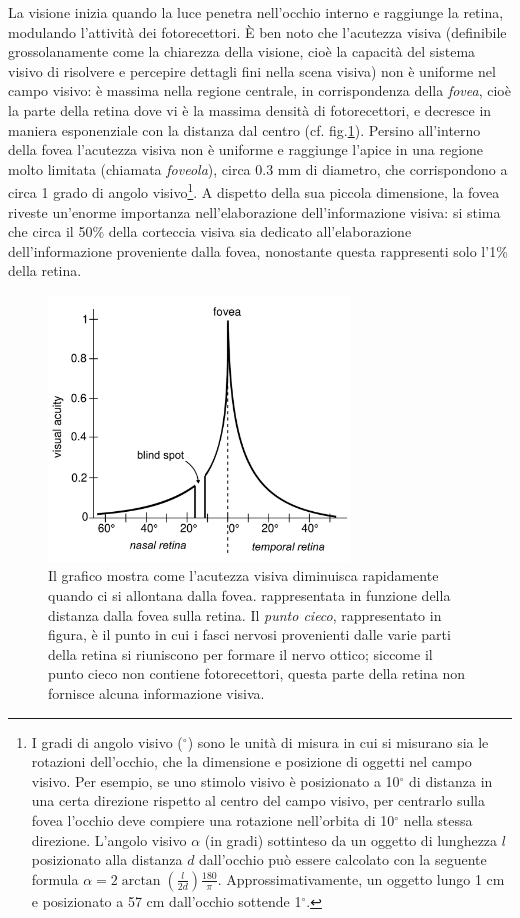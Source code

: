 \documentclass[12pt]{article}
\begin{document}
La visione inizia quando la luce penetra nell'occhio interno e raggiunge la retina, modulando l'attivit\`a dei fotorecettori. \`E ben noto che l'acutezza visiva (definibile grossolanamente come la chiarezza della visione, cio\`e la capacità del sistema visivo di risolvere e percepire dettagli fini nella scena visiva) non \`e uniforme nel campo visivo: \`e massima nella regione centrale, in corrispondenza della \textit{fovea}, cioè la parte della retina dove vi \`e la massima densità di fotorecettori, e decresce in maniera esponenziale con la distanza dal centro (cf. fig.\ref{fig1}). Persino all'interno della fovea l'acutezza visiva non \`e uniforme e raggiunge l'apice in una regione molto limitata (chiamata \textit{foveola}), circa 0.3 mm di diametro, che corrispondono a circa 1 grado di angolo visivo\footnote{I gradi di angolo visivo ($^{\circ}$) sono le unit\`a di misura in cui si misurano sia le rotazioni dell'occhio, che la dimensione e posizione di oggetti nel campo visivo. Per esempio, se uno stimolo visivo è posizionato a 10$^{\circ}$ di distanza in una certa direzione rispetto al centro del campo visivo, per centrarlo sulla fovea l'occhio deve compiere una rotazione nell'orbita di 10$^{\circ}$ nella stessa direzione. L'angolo visivo $\alpha$ (in gradi) sottinteso da un oggetto di lunghezza $l$ posizionato alla distanza $d$ dall'occhio può essere calcolato con la seguente formula $\alpha = 2 \arctan(\frac{l}{2d}) \frac{180}{\pi}$. Approssimativamente, un oggetto lungo 1 cm e posizionato a 57 cm dall'occhio sottende 1$^{\circ}$.}. A dispetto della sua piccola dimensione, la fovea riveste un'enorme importanza nell'elaborazione dell'informazione visiva: si stima che circa il 50\% della corteccia visiva sia dedicato all'elaborazione dell'informazione proveniente dalla fovea, nonostante questa rappresenti solo l'1\% della retina. 

\begin{figure}
\centering
\includegraphics[width=80mm]{fig1.pdf}
\caption{Il grafico mostra come l'acutezza visiva diminuisca rapidamente quando ci si allontana dalla fovea. rappresentata in funzione della distanza dalla fovea sulla retina. Il \textit{punto cieco}, rappresentato in figura, è il punto in cui i fasci nervosi provenienti dalle varie parti della retina si riuniscono per formare il nervo ottico; siccome il punto cieco non contiene fotorecettori, questa parte della retina non fornisce alcuna informazione visiva.}
\label{fig1}
\end{figure}
\end{document}
